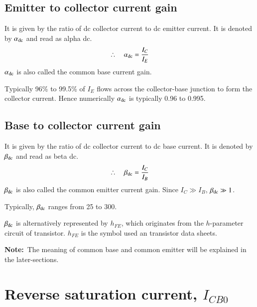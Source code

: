 \subsection{Emitter to collector current gain}\label{sec3.8.1}

It is given by the ratio of dc collector current to dc emitter current. It is denoted by $\alpha_{\operatorname{dc}}$ and read as alpha dc.
\begin{equation}
\therefore\quad \alpha_{\operatorname{dc}}=\dfrac{I_{C}}{I_{E}}\label{eq3.3}
\end{equation}
$\alpha_{\operatorname{dc}}$ is also called the common base current gain.

Typically 96\% to 99.5\% of $I_{E}$ flows across the collector-base junction to form the collector current. Hence numerically $\alpha_{\operatorname{dc}}$ is typically 0.96 to 0.995.

\subsection{Base to collector current gain}\label{sec3.8.2}

It is given by the ratio of dc collector current to dc base current. It is denoted by $\beta_{\operatorname{dc}}$ and read as beta dc.
\begin{equation}
\therefore\quad \beta_{\operatorname{dc}}=\dfrac{I_{C}}{I_{B}}\label{eq3.4}
\end{equation}
$\beta_{\operatorname{dc}}$ is also called the common emitter current gain. Since $I_{C}\gg I_{B}$, $\beta_{\operatorname{dc}}\gg 1$.

Typically, $\beta_{\operatorname{dc}}$ ranges from 25 to 300.

$\beta_{\operatorname{dc}}$ is alternatively represented by $h_{FE}$, which originates from the $h$-parameter circuit of transistor. $h_{FE}$ is the symbol used an transistor data sheets.

\smallskip
\noindent
{\bf Note:}~The meaning of common base and common emitter will be explained in the later-sections.

\section[Reverse saturation current, $I_{CB0}$]{Reverse saturation current, \boldmath$I_{CB0}$}\label{sec3.9}

